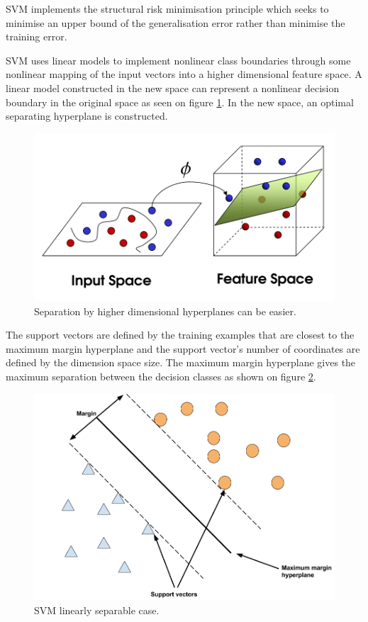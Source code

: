 \documentclass[11pt,a4paper,oneside]{book}
\begin{document}
SVM implements the structural risk minimisation principle which seeks to minimise an upper bound of the generalisation error rather than minimise the training error.

SVM uses linear models to implement nonlinear class boundaries through some nonlinear mapping of the input vectors into a higher dimensional feature space. A linear model constructed in the new space can represent a nonlinear decision boundary in the original space as seen on figure \ref{fig:svm}. In the new space, an optimal separating hyperplane is constructed. \cite{kim}\cite{liwang}\cite{Smola}


\begin{figure}[!h]
  \centering
    \includegraphics[scale=0.45]{img/svm.png}
  \caption{Separation by higher dimensional hyperplanes can be easier.}
  \label{fig:svm}
\end{figure}


The support vectors are defined by the training examples that are closest to the maximum margin hyperplane and the support vector's number of coordinates are defined by the dimension space size. The maximum margin hyperplane gives the maximum separation between the decision classes as shown on figure \ref{fig:svm_linear_sep}. 

\begin{figure}[!h]
  \centering
    \includegraphics[scale=0.3]{img/svm1.png}
  \caption{SVM linearly separable case.}
  \label{fig:svm_linear_sep}
\end{figure}
\end{document}
